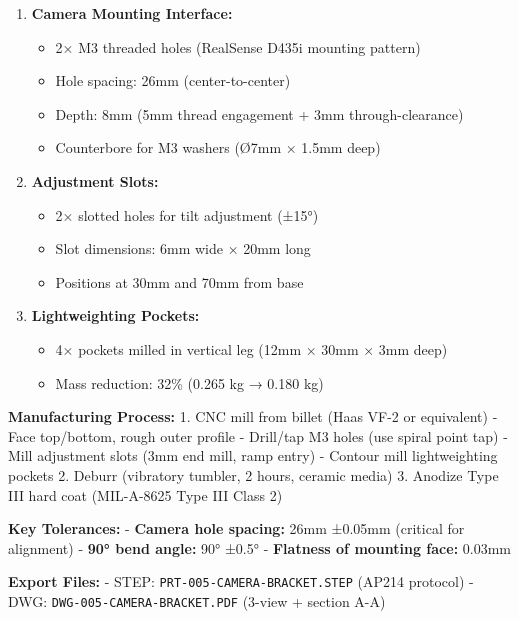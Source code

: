 \documentclass[
]{article}
\providecommand{\tightlist}{%
  \setlength{\itemsep}{0pt}\setlength{\parskip}{0pt}}
\begin{document}
\begin{enumerate}
\def\labelenumi{\arabic{enumi}.}
\setcounter{enumi}{1}
\tightlist
\item
  \textbf{Camera Mounting Interface:}

  \begin{itemize}
  \tightlist
  \item
    2× M3 threaded holes (RealSense D435i mounting pattern)
  \item
    Hole spacing: 26mm (center-to-center)
  \item
    Depth: 8mm (5mm thread engagement + 3mm through-clearance)
  \item
    Counterbore for M3 washers (Ø7mm × 1.5mm deep)
  \end{itemize}
\item
  \textbf{Adjustment Slots:}

  \begin{itemize}
  \tightlist
  \item
    2× slotted holes for tilt adjustment (±15°)
  \item
    Slot dimensions: 6mm wide × 20mm long
  \item
    Positions at 30mm and 70mm from base
  \end{itemize}
\item
  \textbf{Lightweighting Pockets:}

  \begin{itemize}
  \tightlist
  \item
    4× pockets milled in vertical leg (12mm × 30mm × 3mm deep)
  \item
    Mass reduction: 32\% (0.265 kg → 0.180 kg)
  \end{itemize}
\end{enumerate}

\textbf{Manufacturing Process:} 1. CNC mill from billet (Haas VF-2 or
equivalent) - Face top/bottom, rough outer profile - Drill/tap M3 holes
(use spiral point tap) - Mill adjustment slots (3mm end mill, ramp
entry) - Contour mill lightweighting pockets 2. Deburr (vibratory
tumbler, 2 hours, ceramic media) 3. Anodize Type III hard coat
(MIL-A-8625 Type III Class 2)

\textbf{Key Tolerances:} - \textbf{Camera hole spacing:} 26mm ±0.05mm
(critical for alignment) - \textbf{90° bend angle:} 90° ±0.5° -
\textbf{Flatness of mounting face:} 0.03mm

\textbf{Export Files:} - STEP: \texttt{PRT-005-CAMERA-BRACKET.STEP}
(AP214 protocol) - DWG: \texttt{DWG-005-CAMERA-BRACKET.PDF} (3-view +
section A-A)
\end{document}

